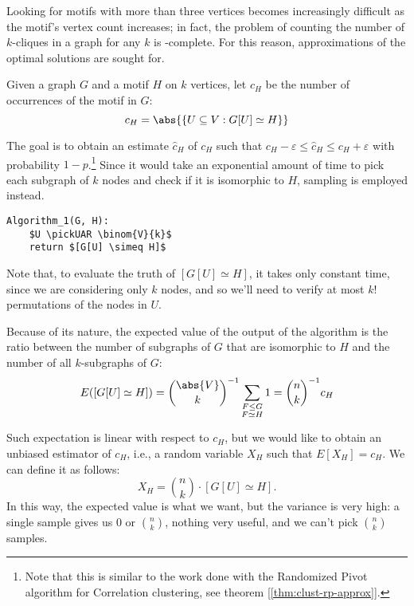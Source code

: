 Looking for motifs with more than three vertices becomes increasingly difficult as the motif's vertex count increases; in fact, the problem of counting the number of $k$-cliques in a graph for any $k$ is \np-complete. For this reason, approximations of the optimal solutions are sought for.

\begin{definition}
    Given a graph $G$ and a motif $H$ on $k$ vertices, let $c_H$ be the number of occurrences of the motif in $G$:
    \begin{equation}\label{eq:motif}
        c_H = \abs{\{U \subseteq V : G[U] \simeq H\}}
    \end{equation}
\end{definition}

The goal is to obtain an estimate $\hat{c}_H$ of $c_H$ such that $c_H - \varepsilon \leq \hat{c}_H \leq c_H + \varepsilon$ with probability $1 - p$.\footnote{Note that this is similar to the work done with the Randomized Pivot algorithm for Correlation clustering, see theorem [\ref{thm:clust-rp-approx}].} Since it would take an exponential amount of time to pick each subgraph of $k$ nodes and check if it is isomorphic to $H$, sampling is employed instead.
\begin{lstlisting}[caption = {Algorithm 1}, label = {lst:motifs-alg1}]
Algorithm_1(G, H):
    $U \pickUAR \binom{V}{k}$
    return $[G[U] \simeq H]$
\end{lstlisting}
Note that, to evaluate the truth of $[G[U] \simeq H]$, it takes only constant time, since we are considering only $k$ nodes, and so we'll need to verify at most $k!$ permutations of the nodes in $U$.

Because of its \uar{} nature, the expected value of the output of the algorithm is the ratio between the number of subgraphs of $G$ that are isomorphic to $H$ and the number of all $k$-subgraphs of $G$:
\begin{equation}\label{eq:eyh-1}
    E([G[U] \simeq H]) = \binom{\abs{V}}{k}^{-1} \sum_{\substack{F \leq G \\ F \simeq H}} 1 = \binom{n}{k}^{-1} c_H
\end{equation}

Such expectation is linear with respect to $c_H$, but we would like to obtain an unbiased estimator of $c_H$, i.e., a random variable $X_H$ such that $E[X_H] = c_H$. We can define it as follows:
\begin{equation}\label{eq:exh-1}
    X_H = \binom{n}{k} \cdot [G[U] \simeq H].
\end{equation}
In this way, the expected value is what we want, but the variance is very high: a single sample gives us 0 or $\binom{n}{k}$, nothing very useful, and we can't pick $\binom{n}{k}$ samples.

